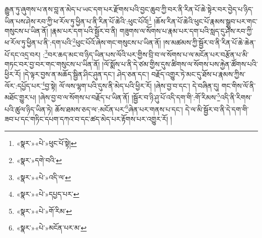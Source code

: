 རྒྱུན་ཏུ་ཞུགས་པ་ནས་བླ་ན་མེད་པ་ཡང་དག་པར་རྫོགས་པའི་བྱང་ཆུབ་ཀྱི་བར་ནི་རིན་པོ་ཆེ་སྟེར་བར་བྱེད་པ་ཉིད་ཡིན་པས་ཤེས་རབ་ཀྱི་ཕ་རོལ་ཏུ་ཕྱིན་པ་ནི་རིན་པོ་ཆེའི་:ཕུང་པོའོ།\footnote{«སྣར་»«པེ་»ཕུང་པོ་སྟེ།} །ཆོས་རིན་པོ་ཆེའི་ཕུང་པོ་རྣམས་སྒྲུབ་པར་གང་གསུངས་པ་ཡིན་ནོ། །རྣམ་པར་དག་པའི་སྦྱོར་བ་ནི། གཟུགས་ལ་སོགས་པ་རྣམ་པར་དག་པའི་སླད་དུ་ཤེས་རབ་ཀྱི་ཕ་རོལ་ཏུ་ཕྱིན་པ་ནི་:དག་པའི་\footnote{«སྣར་»དགེ་བའི་}ཕུང་པོའོ་ཞེས་གང་གསུངས་པ་ཡིན་ནོ། །ས་མཚམས་ཀྱི་སྦྱོར་བ་ནི་རིན་པོ་ཆེ་ཆེན་པོ་དང་འདྲ་བར། :\footnote{«སྣར་»«པེ་»འདི་ལ་}བར་ཆད་མང་བ་ཉིད་ཡིན་པས་ལོའི་པར་གྱིས་བྲི་བ་ལ་སོགས་པ་ལ་མངོན་པར་བརྩོན་པ་མི་གཏང་བར་བྱ་བར་གང་གསུངས་པ་ཡིན་ནོ། །ལོ་སྨོས་པ་ནི་དེ་ཙམ་གྱིས་དུས་ཚིགས་ལ་སོགས་པས་རྐྱེན་ཚོགས་པའི་ཕྱིར་རོ། །དེ་ལྟར་བྱས་ན་མཆོད་སྦྱིན་ཤིང་ཤུན་དང་། ཤེད་ཅན་དང་། བརྗོད་འགྱུར་ཏེ་མང་དུ་ཐོས་པ་རྣམས་ཀྱིས་ལོར་:དཔྱོད་པར་\footnote{«སྣར་»«པེ་»དཔྱད་པར་}བྱ་སྟེ། ལོ་ལས་ལྷག་པའི་དུས་ནི་མེད་པའི་ཕྱིར་རོ། །ཞེས་བྱ་བ་དང་། དེ་བཞིན་དུ། གང་གིས་ལོ་ནི་མཐོང་གྱུར་པ། །ཞེས་བྱ་བ་ལ་སོགས་པ་བརྗོད་པ་ཡིན་ནོ། །སྦྱོར་བ་ཉི་ཤུ་པོ་འདི་དག་གི་:གོ་རིམས་\footnote{«སྣར་»«པེ་»གོ་རིམ་}འདི་ནི་རིགས་པའི་ཚུལ་ཉིད་ཡིན་ཏེ། ཆོས་ཐམས་ཅད་ལ་:མངོན་པར་\footnote{«སྣར་»«པེ་»མངོན་པར་མ་}ཞེན་པར་གནས་པ་དང་། དེ་ལ་མི་སྦྱོར་བ་ནི་དེ་དག་གི་ཟབ་པ་དང་གཏིང་དཔག་དཀའ་བ་དང་ཚད་མེད་པར་རྟོགས་པར་འགྱུར་རོ། །

